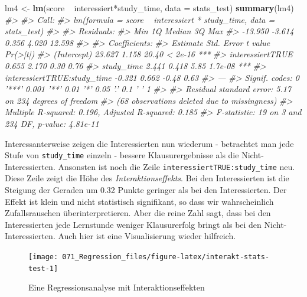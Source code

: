 \documentclass[12pt,ngerman,]{book}
\makeatletter
\newenvironment{Shaded}{\begin{snugshade}}{\end{snugshade}}
\newcommand{\KeywordTok}[1]{\textcolor[rgb]{0.13,0.29,0.53}{\textbf{{#1}}}}
\newcommand{\DataTypeTok}[1]{\textcolor[rgb]{0.13,0.29,0.53}{{#1}}}
\newcommand{\StringTok}[1]{\textcolor[rgb]{0.31,0.60,0.02}{{#1}}}
\newcommand{\CommentTok}[1]{\textcolor[rgb]{0.56,0.35,0.01}{\textit{{#1}}}}
\newcommand{\NormalTok}[1]{{#1}}
\newenvironment{kframe}{%
\medskip{}
\setlength{\fboxsep}{.8em}
 \def\at@end@of@kframe{}%
 \ifinner\ifhmode%
  \def\at@end@of@kframe{\end{minipage}}%
  \begin{minipage}{\columnwidth}%
 \fi\fi%
 \def\FrameCommand##1{\hskip\@totalleftmargin \hskip-\fboxsep
 \colorbox{shadecolor}{##1}\hskip-\fboxsep
     \hskip-\linewidth \hskip-\@totalleftmargin \hskip\columnwidth}%
 \MakeFramed {\advance\hsize-\width
   \@totalleftmargin\z@ \linewidth\hsize
   \@setminipage}}%
 {\par\unskip\endMakeFramed%
 \at@end@of@kframe}
\renewenvironment{Shaded}{\begin{kframe}}{\end{kframe}}
\theoremstyle{definition}
\theoremstyle{definition}
\theoremstyle{remark}
\makeatother
\begin{document}
\begin{Shaded}
\begin{Highlighting}[]
\NormalTok{lm4 <-}\StringTok{ }\KeywordTok{lm}\NormalTok{(score ~}\StringTok{ }\NormalTok{interessiert*study_time, }\DataTypeTok{data =} \NormalTok{stats_test)}
\KeywordTok{summary}\NormalTok{(lm4)}
\CommentTok{#> }
\CommentTok{#> Call:}
\CommentTok{#> lm(formula = score ~ interessiert * study_time, data = stats_test)}
\CommentTok{#> }
\CommentTok{#> Residuals:}
\CommentTok{#>     Min      1Q  Median      3Q     Max }
\CommentTok{#> -13.950  -3.614   0.356   4.020  12.598 }
\CommentTok{#> }
\CommentTok{#> Coefficients:}
\CommentTok{#>                             Estimate Std. Error t value Pr(>|t|)    }
\CommentTok{#> (Intercept)                   23.627      1.158   20.40  < 2e-16 ***}
\CommentTok{#> interessiertTRUE               0.655      2.170    0.30     0.76    }
\CommentTok{#> study_time                     2.441      0.418    5.85  1.7e-08 ***}
\CommentTok{#> interessiertTRUE:study_time   -0.321      0.662   -0.48     0.63    }
\CommentTok{#> ---}
\CommentTok{#> Signif. codes:  0 '***' 0.001 '**' 0.01 '*' 0.05 '.' 0.1 ' ' 1}
\CommentTok{#> }
\CommentTok{#> Residual standard error: 5.17 on 234 degrees of freedom}
\CommentTok{#>   (68 observations deleted due to missingness)}
\CommentTok{#> Multiple R-squared:  0.196,  Adjusted R-squared:  0.185 }
\CommentTok{#> F-statistic:   19 on 3 and 234 DF,  p-value: 4.81e-11}
\end{Highlighting}
\end{Shaded}

Interessanterweise zeigen die Interessierten nun wiederum - betrachtet
man jede Stufe von \texttt{study\_time} einzeln - bessere
Klausurergebnisse als die Nicht-Interessierten. Ansonsten ist noch die
Zeile \texttt{interessiertTRUE:study\_time} neu. Diese Zeile zeigt die
Höhe des \emph{Interaktionseffekts}. Bei den
Interessierten ist die Steigung der Geraden um 0.32 Punkte geringer als
bei den Interessierten. Der Effekt ist klein und nicht statistisch
signifikant, so dass wir wahrscheinlich Zufallsrauschen
überinterpretieren. Aber die reine Zahl sagt, dass bei den
Interessierten jede Lernstunde weniger Klausurerfolg bringt als bei den
Nicht-Interessierten. Auch hier ist eine Visualisierung wieder
hilfreich.

\begin{figure}

{\centering \texttt{[image: 071\_Regression\_files/figure-latex/interakt-stats-test-1]} 

}

\caption{Eine Regressionsanalyse mit Interaktionseffekten}\label{fig:interakt-stats-test}
\end{figure}
\end{document}
